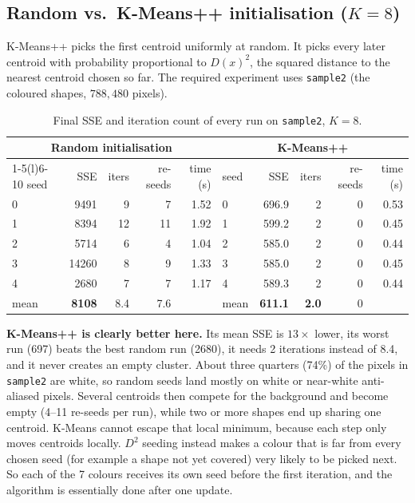 \documentclass[10.5pt]{article}
\begin{document}
\subsection{Random vs.\ K-Means++ initialisation ($K=8$)}

K-Means++ picks the first centroid uniformly at random. It picks every later centroid with probability
proportional to $D(x)^2$, the squared distance to the nearest centroid chosen so far. The required
experiment uses \texttt{sample2} (the coloured shapes, $788{,}480$ pixels).

\begin{table}[H]\centering\small
\begin{tabular}{lrrrr@{\hspace{2.2em}}lrrrr}
\toprule
\multicolumn{5}{c}{\textbf{Random initialisation}} & \multicolumn{5}{c}{\textbf{K-Means++}}\\
\cmidrule(r){1-5}\cmidrule(l){6-10}
seed & SSE & iters & re-seeds & time (s) & seed & SSE & iters & re-seeds & time (s)\\
\midrule
0 & 9491 & 9 & 7 & 1.52 & 0 & 696.9 & 2 & 0 & 0.53\\
1 & 8394 & 12 & 11 & 1.92 & 1 & 599.2 & 2 & 0 & 0.45\\
2 & 5714 & 6 & 4 & 1.04 & 2 & 585.0 & 2 & 0 & 0.44\\
3 & 14260 & 8 & 9 & 1.33 & 3 & 585.0 & 2 & 0 & 0.45\\
4 & 2680 & 7 & 7 & 1.17 & 4 & 589.3 & 2 & 0 & 0.44\\
\midrule
mean & \textbf{8108} & 8.4 & 7.6 & & mean & \textbf{611.1} & \textbf{2.0} & 0 & \\
\bottomrule
\end{tabular}
\caption{Final SSE and iteration count of every run on \texttt{sample2}, $K=8$.}
\end{table}

\textbf{K-Means++ is clearly better here.} Its mean SSE is $13\times$ lower, its worst run (697)
beats the best random run (2680), it needs 2 iterations instead of 8.4, and it never creates an empty
cluster. About three quarters (74\%) of the pixels in \texttt{sample2} are white, so random seeds land mostly on white
or near-white anti-aliased pixels. Several centroids then compete for the background and become empty
(4--11 re-seeds per run), while two or more shapes end up sharing one centroid. K-Means cannot escape
that local minimum, because each step only moves centroids locally. $D^2$ seeding instead makes a
colour that is far from every chosen seed (for example a shape not yet covered) very likely to be
picked next. So each of the 7 colours receives its own seed before the first iteration, and the
algorithm is essentially done after one update.
\end{document}
